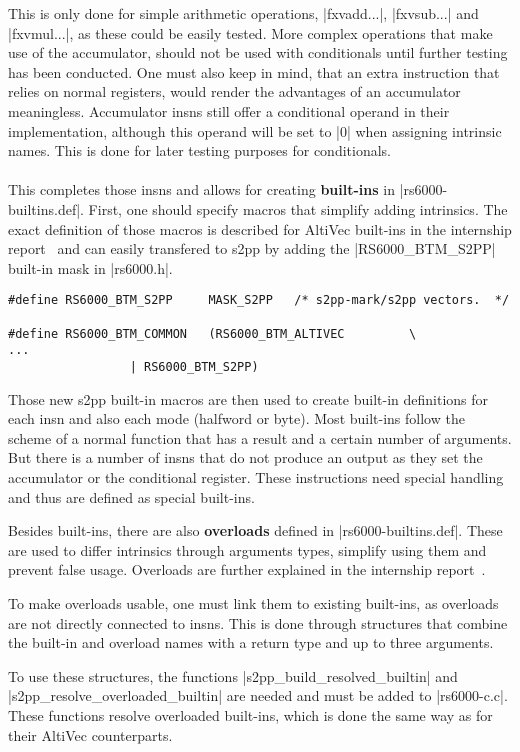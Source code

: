 This is only done for simple arithmetic operations, |fxvadd...|, |fxvsub...| and |fxvmul...|, as these could be easily tested.
More complex operations that make use of the accumulator, should not be used with conditionals until further testing has been conducted.
One must also keep in mind, that an extra instruction that relies on normal registers, would render the advantages of an accumulator meaningless.
Accumulator insns still offer a conditional operand in their implementation, although this operand will be set to |0| when assigning intrinsic names.
This is done for later testing purposes for conditionals.
\\
\\
This completes those insns and allows for creating \textbf{built-ins} in |rs6000-builtins.def|.
First, one should specify macros that simplify adding intrinsics.
The exact definition of those macros is described for AltiVec built-ins in the internship report~\citep{heimbrecht_2017internship} and can easily transfered to \ac{s2pp} by adding the |RS6000_BTM_S2PP| built-in mask in |rs6000.h|.
\begin{lstlisting}
#define RS6000_BTM_S2PP     MASK_S2PP   /* s2pp-mark/s2pp vectors.  */

#define RS6000_BTM_COMMON   (RS6000_BTM_ALTIVEC         \
...
                 | RS6000_BTM_S2PP)
\end{lstlisting}

Those new s2pp built-in macros are then used to create built-in definitions for each insn and also each mode (halfword or byte).
Most built-ins follow the scheme of a normal function that has a result and a certain number of arguments.
But there is a number of insns that do not produce an output as they set the accumulator or the conditional register.
These instructions need special handling and thus are defined as special built-ins.

Besides built-ins, there are also \textbf{overloads} defined in |rs6000-builtins.def|.
These are used to differ intrinsics through arguments types, simplify using them and prevent false usage.
Overloads are further explained in the internship report~\citep{heimbrecht_2017internship}.

To make overloads usable, one must link them to existing built-ins, as overloads are not directly connected to insns.
This is done through structures that combine the built-in and overload names with a return type and up to three arguments.

To use these structures, the functions |s2pp_build_resolved_builtin| and |s2pp_resolve_overloaded_builtin| are needed and must be added to |rs6000-c.c|.
These functions resolve overloaded built-ins, which is done the same way as for their AltiVec counterparts.

